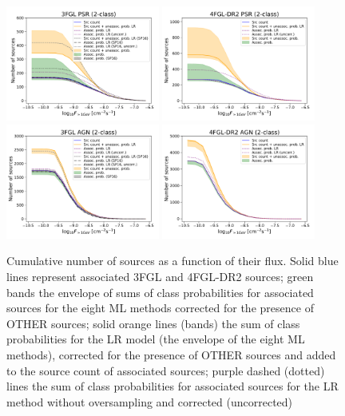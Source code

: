 \documentclass[referee]{aa} %
\begin{document}
\begin{figure}[h]
\centering
\includegraphics[width=0.45\textwidth]{plots/N_logS_3FGL_PSR_SazP_add_os.pdf}
\includegraphics[width=0.45\textwidth]{plots/N_logS_4FGL-DR2_PSR_add_os.pdf} \\
\includegraphics[width=0.45\textwidth]{plots/N_logS_3FGL_AGN_SazP_add_os.pdf}
\includegraphics[width=0.45\textwidth]{plots/N_logS_4FGL-DR2_AGN_add_os.pdf}
\caption{Cumulative number of sources as a function of their flux. 
Solid blue lines represent associated 3FGL and 4FGL-DR2  sources; green bands the envelope of sums of class probabilities for associated sources for the eight ML methods corrected for the presence of OTHER sources; solid orange lines (bands) the sum of class probabilities for the LR model (the envelope of the eight ML methods), corrected for the presence of OTHER sources and added to the source count of associated sources; purple dashed (dotted) lines the sum of class probabilities for associated sources for the LR method without oversampling and corrected (uncorrected)
}
\end{figure}
\end{document}
